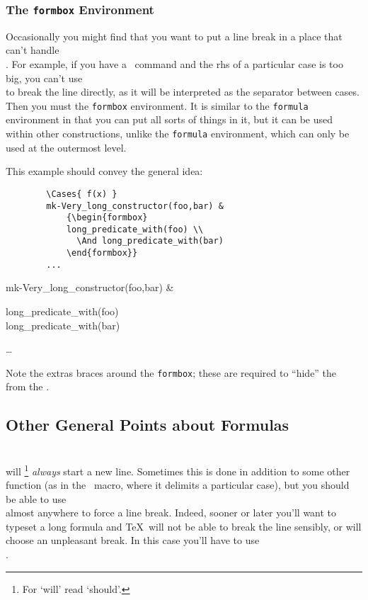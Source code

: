 {\subsubsection*{The {\tt formbox} Environment}

Occasionally you might find that you want to put a line break in a
place that can't handle \cs\\.  For example, if you have a \cs\Cases\
command and the rhs of a particular case is too big, you can't use
\cs\\ to break the line directly, as it will be interpreted as the
separator between cases.  Then you must the {\tt formbox} environment.
It is similar to the {\tt formula} environment in that you can put all
sorts of things in it, but it can be used within other constructions,
unlike the {\tt formula} environment, which can only be used at the
outermost level.

This example should convey the general idea:
\begin{verbatim}
        \Cases{ f(x) }
        mk-Very_long_constructor(foo,bar) &
            {\begin{formbox}
            long_predicate_with(foo) \\
              \And long_predicate_with(bar)
            \end{formbox}}
        ...
\end{verbatim}
\begin{formula}
        mk-Very_long_constructor(foo,bar) &
            {\begin{formbox}
            long_predicate_with(foo) \\
              \And long_predicate_with(bar)
            \end{formbox}}
        \ldots
	\Endcases
\end{formula}
Note the extras braces around the {\tt formbox}; these are required to
``hide'' the \cs\\ from the \cs\Cases.

\subsection*{Other General Points about Formulas}

\cs\\ will%
\footnote{For `will' read `should'.} 
{\em always\/}
start a new line.  Sometimes this is done in addition to some other
function (as in the \cs\Cases\ macro, where it delimits a
particular case), but you should be able to use \cs\\ almost
anywhere to force a line break.  Indeed, sooner or later you'll want
to typeset a long formula and \TeX\ will not be able to break the line
sensibly, or will choose an unpleasant break.  In this case you'll
have to use \cs\\.

}
